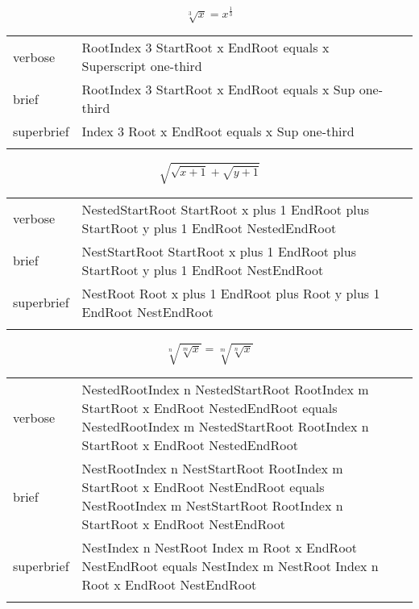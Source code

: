 \E \[\sqrt[3]{x}=x^{\frac{1}{3}}\]
\begin{longtable}[c]{@{}lll@{}}
\toprule\addlinespace
verbose & RootIndex 3 StartRoot x EndRoot equals x Superscript one-third
&

\\\addlinespace
brief & RootIndex 3 StartRoot x EndRoot equals x Sup one-third &

\\\addlinespace
superbrief & Index 3 Root x EndRoot equals x Sup one-third &

\\\addlinespace
\bottomrule
\end{longtable}


\R
\E \[\sqrt{\sqrt{x+1}+\sqrt{y+1}}\]
\begin{longtable}[c]{@{}lll@{}}
\toprule\addlinespace
verbose & NestedStartRoot StartRoot x plus 1 EndRoot plus StartRoot y
plus 1 EndRoot NestedEndRoot &

\\\addlinespace
brief & NestStartRoot StartRoot x plus 1 EndRoot plus StartRoot y plus 1
EndRoot NestEndRoot &

\\\addlinespace
superbrief & NestRoot Root x plus 1 EndRoot plus Root y plus 1 EndRoot
NestEndRoot &

\\\addlinespace
\bottomrule
\end{longtable}


\E \[\sqrt[n]{\sqrt[m]{x}}=\sqrt[m]{\sqrt[n]{x}}\]
\begin{longtable}[c]{@{}lll@{}}
\toprule\addlinespace
verbose & NestedRootIndex n NestedStartRoot RootIndex m StartRoot x
EndRoot NestedEndRoot equals NestedRootIndex m NestedStartRoot RootIndex
n StartRoot x EndRoot NestedEndRoot &

\\\addlinespace
brief & NestRootIndex n NestStartRoot RootIndex m StartRoot x EndRoot
NestEndRoot equals NestRootIndex m NestStartRoot RootIndex n StartRoot x
EndRoot NestEndRoot &

\\\addlinespace
superbrief & NestIndex n NestRoot Index m Root x EndRoot NestEndRoot
equals NestIndex m NestRoot Index n Root x EndRoot NestEndRoot &

\\\addlinespace
\bottomrule
\end{longtable}


